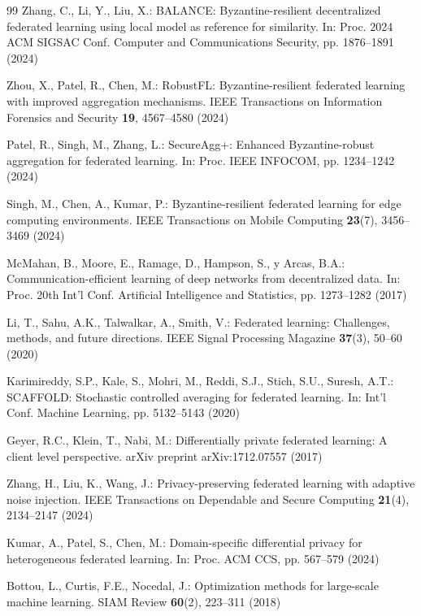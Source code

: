 \documentclass[12pt,a4paper]{article}
\theoremstyle{definition}
\begin{document}
\begin{thebibliography}{99}
Zhang, C., Li, Y., Liu, X.: BALANCE: Byzantine-resilient decentralized federated learning using local model as reference for similarity. In: Proc. 2024 ACM SIGSAC Conf. Computer and Communications Security, pp. 1876--1891 (2024)

Zhou, X., Patel, R., Chen, M.: RobustFL: Byzantine-resilient federated learning with improved aggregation mechanisms. IEEE Transactions on Information Forensics and Security \textbf{19}, 4567--4580 (2024)

Patel, R., Singh, M., Zhang, L.: SecureAgg+: Enhanced Byzantine-robust aggregation for federated learning. In: Proc. IEEE INFOCOM, pp. 1234--1242 (2024)

Singh, M., Chen, A., Kumar, P.: Byzantine-resilient federated learning for edge computing environments. IEEE Transactions on Mobile Computing \textbf{23}(7), 3456--3469 (2024)

McMahan, B., Moore, E., Ramage, D., Hampson, S., y Arcas, B.A.: Communication-efficient learning of deep networks from decentralized data. In: Proc. 20th Int'l Conf. Artificial Intelligence and Statistics, pp. 1273--1282 (2017)

Li, T., Sahu, A.K., Talwalkar, A., Smith, V.: Federated learning: Challenges, methods, and future directions. IEEE Signal Processing Magazine \textbf{37}(3), 50--60 (2020)

Karimireddy, S.P., Kale, S., Mohri, M., Reddi, S.J., Stich, S.U., Suresh, A.T.: SCAFFOLD: Stochastic controlled averaging for federated learning. In: Int'l Conf. Machine Learning, pp. 5132--5143 (2020)

Geyer, R.C., Klein, T., Nabi, M.: Differentially private federated learning: A client level perspective. arXiv preprint arXiv:1712.07557 (2017)

Zhang, H., Liu, K., Wang, J.: Privacy-preserving federated learning with adaptive noise injection. IEEE Transactions on Dependable and Secure Computing \textbf{21}(4), 2134--2147 (2024)

Kumar, A., Patel, S., Chen, M.: Domain-specific differential privacy for heterogeneous federated learning. In: Proc. ACM CCS, pp. 567--579 (2024)

Bottou, L., Curtis, F.E., Nocedal, J.: Optimization methods for large-scale machine learning. SIAM Review \textbf{60}(2), 223--311 (2018)


\end{thebibliography}
\end{document}
